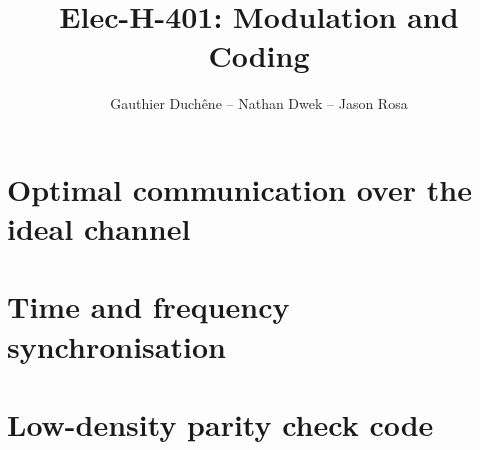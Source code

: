 

\title{Elec-H-401: Modulation and Coding}
\author{Gauthier Duchêne -- Nathan Dwek -- Jason Rosa}
\date{}


\maketitle
\tableofcontents
\clearpage
\hypersetup{allcolors = link}

\section{Optimal communication over the ideal channel}


\section{Time and frequency synchronisation}


\section{Low-density parity check code}



